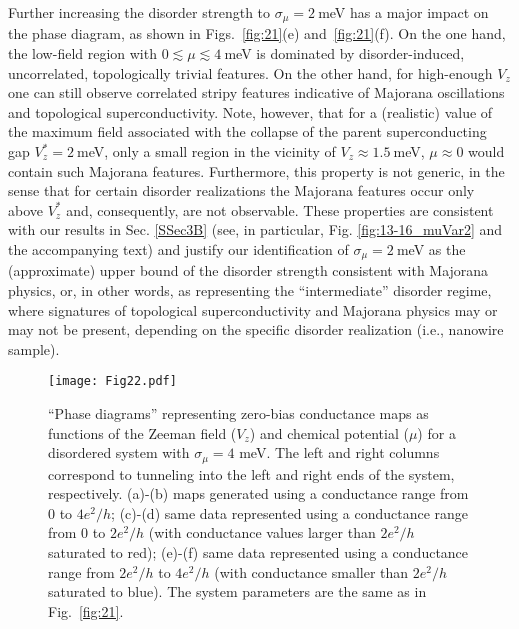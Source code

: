 \documentclass[aps,prmaterials,twocolumn,superscriptaddress,longbibliography]{revtex4-2}
\begin{document}
Further increasing the disorder strength to $\sigma_\mu=2~$meV has a major impact on the phase diagram, as shown in  Figs.~\ref{fig:21}(e) and~\ref{fig:21}(f). On the one hand, the low-field region with $0\lesssim \mu\lesssim 4~$meV is dominated by disorder-induced, uncorrelated, topologically trivial features. On the other hand, for high-enough $V_z$ one can still observe correlated stripy features indicative of Majorana oscillations and topological superconductivity. Note, however, that for a (realistic) value of the maximum field associated with the collapse of the parent superconducting gap  $V_z^*=2~$meV, only a small region in the vicinity of $V_z\approx 1.5~$meV, $\mu\approx 0$  would contain such Majorana features. Furthermore, this property is not generic, in the sense that for certain disorder realizations the Majorana features occur only above $V_z^*$ and, consequently, are not observable. These properties are consistent with our results in Sec. \ref{SSec3B} (see, in particular, Fig. \ref{fig:13-16_muVar2} and the accompanying text) and justify our identification of $\sigma_\mu=2~$meV as the (approximate) upper bound of the disorder strength consistent with Majorana physics, or, in other words, as representing the  ``intermediate'' disorder regime, where signatures of topological superconductivity and Majorana physics may or may not be present, depending on the specific disorder realization (i.e.,  nanowire sample). 

\begin{figure}[t]
    \centering
    \texttt{[image: Fig22.pdf]}
    \caption{``Phase diagrams'' representing  zero-bias conductance maps as functions of the Zeeman field ($V_z$) and chemical potential ($\mu$) for a disordered system with $\sigma_\mu=4$ meV. The left and right columns correspond to tunneling into the left and right ends of the system, respectively.   
    (a)-(b) maps generated using a conductance range from 0 to $4e^2/h$; (c)-(d) same data represented using a conductance range from 0 to $2e^2/h$ (with conductance values larger than $2e^2/h$ saturated to red); (e)-(f)  same data represented using a  conductance range from $2e^2/h$ to $4e^2/h$ (with conductance smaller than $2e^2/h$ saturated to blue).
    The system parameters are the same as in Fig.~\ref{fig:21}.}
    \label{fig:22}
\end{figure}
\end{document}
